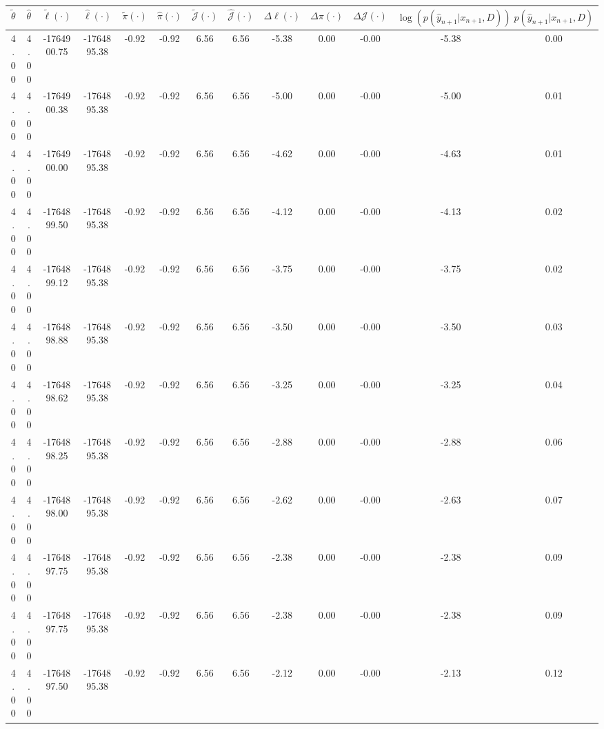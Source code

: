 \begin{table}[htbp]
        \centering
        \tiny
        \begin{adjustbox}{angle=90}
            \begin{tabular}{|c|c|c|c|c|c|c|c|c|c|c|c|c|}
                \hline
                 $\tilde{\theta}$ & $\hat{\theta}$ & $\tilde{\ell}(\cdot)$ & $\hat{\ell}(\cdot)$ & $\tilde{\pi}(\cdot)$ & $\hat{\pi}(\cdot)$ & $\tilde{\mathcal{J}}(\cdot)$ & $\hat{\mathcal{J}}(\cdot)$ & $\Delta \ell(\cdot)$ & $\Delta \pi(\cdot)$ & $\Delta \mathcal{J}(\cdot)$ & $\log(p(\hat{y}_{n+1}|x_{n+1}, D))$ & $p(\hat{y}_{n+1}|x_{n+1}, D)$ \\
                \hline
                 4.00 & 4.00 & -1764900.75 & -1764895.38 & -0.92 & -0.92 & 6.56 & 6.56 & -5.38 & 0.00 & -0.00 & -5.38 & 0.00\\ \hline
 4.00 & 4.00 & -1764900.38 & -1764895.38 & -0.92 & -0.92 & 6.56 & 6.56 & -5.00 & 0.00 & -0.00 & -5.00 & 0.01\\ \hline
 4.00 & 4.00 & -1764900.00 & -1764895.38 & -0.92 & -0.92 & 6.56 & 6.56 & -4.62 & 0.00 & -0.00 & -4.63 & 0.01\\ \hline
 4.00 & 4.00 & -1764899.50 & -1764895.38 & -0.92 & -0.92 & 6.56 & 6.56 & -4.12 & 0.00 & -0.00 & -4.13 & 0.02\\ \hline
 4.00 & 4.00 & -1764899.12 & -1764895.38 & -0.92 & -0.92 & 6.56 & 6.56 & -3.75 & 0.00 & -0.00 & -3.75 & 0.02\\ \hline
 4.00 & 4.00 & -1764898.88 & -1764895.38 & -0.92 & -0.92 & 6.56 & 6.56 & -3.50 & 0.00 & -0.00 & -3.50 & 0.03\\ \hline
 4.00 & 4.00 & -1764898.62 & -1764895.38 & -0.92 & -0.92 & 6.56 & 6.56 & -3.25 & 0.00 & -0.00 & -3.25 & 0.04\\ \hline
 4.00 & 4.00 & -1764898.25 & -1764895.38 & -0.92 & -0.92 & 6.56 & 6.56 & -2.88 & 0.00 & -0.00 & -2.88 & 0.06\\ \hline
 4.00 & 4.00 & -1764898.00 & -1764895.38 & -0.92 & -0.92 & 6.56 & 6.56 & -2.62 & 0.00 & -0.00 & -2.63 & 0.07\\ \hline
 4.00 & 4.00 & -1764897.75 & -1764895.38 & -0.92 & -0.92 & 6.56 & 6.56 & -2.38 & 0.00 & -0.00 & -2.38 & 0.09\\ \hline
 4.00 & 4.00 & -1764897.75 & -1764895.38 & -0.92 & -0.92 & 6.56 & 6.56 & -2.38 & 0.00 & -0.00 & -2.38 & 0.09\\ \hline
 4.00 & 4.00 & -1764897.50 & -1764895.38 & -0.92 & -0.92 & 6.56 & 6.56 & -2.12 & 0.00 & -0.00 & -2.13 & 0.12\\ \hline

\end{tabular}
\end{adjustbox}
\end{table}
